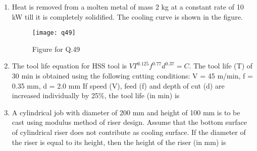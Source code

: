 \documentclass[journal,11pt,onecolumn]{IEEEtran}
\begin{document}
\begin{enumerate}[resume]
    \item Heat is removed from a molten metal of mass 2 kg at a constant rate of 10 kW till it is completely solidified. The cooling curve is shown in the figure.
          \begin{figure}[H]
              \centering
              \texttt{[image: q49]}
              \caption{Figure for Q.49}
              \label{q49}
          \end{figure}

    \item The tool life equation for HSS tool is $VT^{0.125}f^{0.77}d^{0.37} = C$. The tool life (T) of 30 min is obtained using the following cutting conditions:
          V = 45 m/min, f = 0.35 mm, d = 2.0 mm
          If speed (V), feed (f) and depth of cut (d) are increased individually by 25\%, the tool life (in min) is

          \begin{enumerate}


          \end{enumerate}

    \item A cylindrical job with diameter of 200 mm and height of 100 mm is to be cast using modulus method of riser design. Assume that the bottom surface of cylindrical riser does not contribute as cooling surface. If the diameter of the riser is equal to its height, then the height of the riser (in mm) is

          \begin{enumerate}

\end{enumerate}
\end{enumerate}
\end{document}
